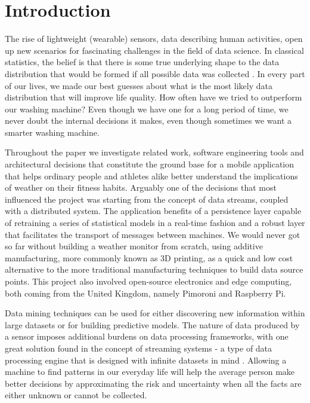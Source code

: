 \chapter*{Introduction}
\pagestyle{fancy}
\label{introduction}

The rise of lightweight (wearable) sensors, data describing human activities, open up new scenarios for fascinating challenges in the field of data science. In classical statistics, the belief is that there is some true underlying shape to the data distribution that would be formed if all possible data was collected \cite{ACL}. In every part of our lives, we made our best guesses about what is the most likely data distribution that will improve life quality. How often have we tried to outperform our washing machine? Even though we have one for a long period of time, we never doubt the internal decisions it makes, even though sometimes we want a smarter washing machine.

Throughout the paper we investigate related work, software engineering tools and architectural decisions that constitute the ground base for a mobile application that helps ordinary people and athletes alike better understand the implications of weather on their fitness habits. Arguably one of the decisions that most influenced the project was starting from the concept of data streams, coupled with a distributed system. The application benefits of a persistence layer capable of retraining a series of statistical models in a real-time fashion and a robust layer that facilitates the transport of messages between machines. We would never got so far without building a weather monitor from scratch, using additive manufacturing, more commonly known as 3D printing, as a quick and low cost alternative to the more traditional manufacturing techniques to build data source points. This project also involved open-source electronics and edge computing, both coming from the United Kingdom, namely Pimoroni and Raspberry Pi.

Data mining techniques can be used for either discovering new information within large datasets or for building predictive models. The nature of data produced by a sensor imposes additional burdens on data processing frameworks, with one great solution found in the concept of streaming systems - a type of data processing engine that is designed with infinite datasets in mind \cite{KurtThearling}. Allowing a machine to find patterns in our everyday life will help the average person make better decisions by approximating the risk and uncertainty when all the facts are either unknown or cannot be collected. 

